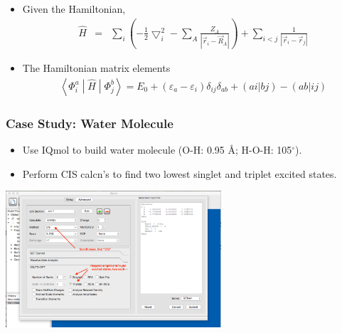 \documentclass{beamer} %
\begin{document}
\begin{frame}
\begin{itemize}
\item \small{Given the Hamiltonian,}
\begin{eqnarray*}
\hat{H} & = &  \sum_i \left(- \frac{1}{2} \bigtriangledown_i^2  - \sum_A \frac{Z_A}{\left| \vec{r}_i - \vec{R}_A \right| } \right) +  \sum_{i < j} \frac{1}{\left| \vec{r}_{i} - \vec{r}_j \right| }  
\end{eqnarray*}

\item The Hamiltonian matrix elements
\begin{eqnarray*}
\left< \Phi_i^a \middle| \hat{H}  \middle| \Phi_j^b \right>  = E_0 + \left( \varepsilon_a - \varepsilon_i \right) \delta_{ij} \delta_{ab}  + ( a i | b j) - ( a b | i j) 
\end{eqnarray*}


\end{itemize}
\end{frame}

\begin{frame}
\frametitle{Case Study: Water Molecule}
\begin{itemize}
\item \small{Use IQmol to build water molecule (O-H: 0.95 \AA; H-O-H: 105$^\circ$). }
\item Perform CIS calcn's to find two lowest singlet and triplet excited states.  
\end{itemize} 
\begin{center}
\includegraphics[height=2.0in]{figures/cis-input.png}
\end{center}
\end{frame}
\end{document}

